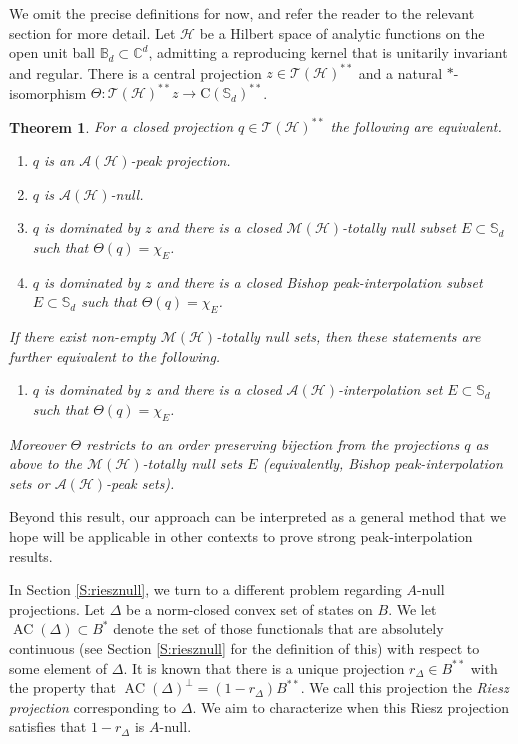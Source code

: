 \documentclass[10pt]{amsart}
\newcommand{\bB}{{\mathbb{B}}}
\newcommand{\bC}{{\mathbb{C}}}
\newcommand{\bS}{{\mathbb{S}}}
\newcommand{\A}{{\mathcal{A}}}
\renewcommand{\H}{{\mathcal{H}}}
\newcommand{\M}{{\mathcal{M}}}
\newcommand{\T}{{\mathcal{T}}}
\newcommand{\rC}{\mathrm{C}}
\newcommand{\AC}{\operatorname{AC}}
\newtheorem{theoremx}{Theorem}
\theoremstyle{definition}
\begin{document}
  We omit the precise definitions for now, and refer the reader to the relevant section for more detail. Let $\H$ be a Hilbert space of analytic functions on the open unit ball $\bB_d\subset \bC^d$, admitting  a reproducing kernel that is unitarily invariant and regular. There is a central projection $z\in \T(\H)^{**}$ and a natural $*$-isomorphism $\Theta: \T(\H)^{**}z\to  \rC(\bS_d)^{**}$.
 



\begin{theoremx} \label{T:B} 
For a closed projection $q \in \T(\H)^{**}$ the following are equivalent.
\begin{enumerate}[{\rm (i)}]
\item $q$ is an $\A(\H)$-peak projection.
\item $q$ is $\A(\H)$-null.
\item $q$ is dominated by $z$ and there is a closed $\M(\H)$-totally null subset $E\subset \bS_d$ such that $\Theta(q)=\chi_E$.
\item $q$ is dominated by $z$ and there is a closed Bishop peak-interpolation subset $E\subset \bS_d$ such that $\Theta(q)=\chi_E$.
\end{enumerate} 
If there exist non-empty $\M(\H)$-totally null sets, then these statements are further equivalent to the following.
\begin{enumerate}
\item[{\rm (v)}]  $q$ is dominated by $z$ and there is a closed $\A(\H)$-interpolation set $E\subset \bS_d$ such that $\Theta(q)=\chi_E$.
\end{enumerate}
 Moreover $\Theta$ restricts to an order preserving  bijection from the 
 projections $q$ as above 
  to the  $\M(\H)$-totally null  sets $E$ (equivalently, Bishop peak-interpolation sets or  $\A(\H)$-peak sets).
  \end{theoremx}



  
Beyond this result,  our approach can be interpreted as 
a general method that we hope will be applicable in other contexts to 
 prove strong peak-interpolation results. 
 
In Section \ref{S:riesznull}, we turn to a different problem regarding $A$-null projections.
Let $\Delta$ be a norm-closed convex set of states on $B$.
We let $\AC(\Delta)\subset B^*$ denote the set of those functionals that are absolutely continuous 
(see Section \ref{S:riesznull} for the definition of this) with respect to some element of $\Delta$.  
It is known \cite[Theorem 3.5]{CT2023Henkin} that  there is a unique projection $r_\Delta\in B^{**}$ with the property that $\AC(\Delta)^\perp=(1-r_\Delta)B^{**}$. We call this projection the \emph{Riesz projection} corresponding to $\Delta$. We aim to characterize when this Riesz projection satisfies that $1-r_\Delta$ is $A$-null. 
\end{document}
